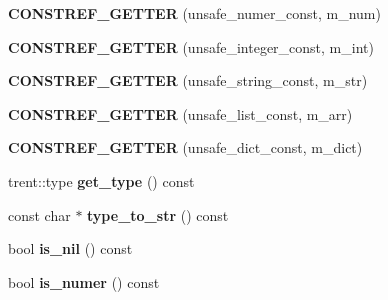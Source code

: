 \begin{DoxyCompactItemize}
\item 
{\bfseries C\+O\+N\+S\+T\+R\+E\+F\+\_\+\+G\+E\+T\+T\+ER} (unsafe\+\_\+numer\+\_\+const, m\+\_\+num)\hypertarget{classgxx_1_1trent_a3c13b54a5b5c8a412837bca0127f3394}{}\label{classgxx_1_1trent_a3c13b54a5b5c8a412837bca0127f3394}

\item 
{\bfseries C\+O\+N\+S\+T\+R\+E\+F\+\_\+\+G\+E\+T\+T\+ER} (unsafe\+\_\+integer\+\_\+const, m\+\_\+int)\hypertarget{classgxx_1_1trent_a32ca1404de878b5351b41cb5bf27bf04}{}\label{classgxx_1_1trent_a32ca1404de878b5351b41cb5bf27bf04}

\item 
{\bfseries C\+O\+N\+S\+T\+R\+E\+F\+\_\+\+G\+E\+T\+T\+ER} (unsafe\+\_\+string\+\_\+const, m\+\_\+str)\hypertarget{classgxx_1_1trent_a14e00a0156824e8ed9f276d70ef95ee1}{}\label{classgxx_1_1trent_a14e00a0156824e8ed9f276d70ef95ee1}

\item 
{\bfseries C\+O\+N\+S\+T\+R\+E\+F\+\_\+\+G\+E\+T\+T\+ER} (unsafe\+\_\+list\+\_\+const, m\+\_\+arr)\hypertarget{classgxx_1_1trent_a0807cad038ec14b2c9ab5be07eaa1ebb}{}\label{classgxx_1_1trent_a0807cad038ec14b2c9ab5be07eaa1ebb}

\item 
{\bfseries C\+O\+N\+S\+T\+R\+E\+F\+\_\+\+G\+E\+T\+T\+ER} (unsafe\+\_\+dict\+\_\+const, m\+\_\+dict)\hypertarget{classgxx_1_1trent_a96a6dc69d63e7cb2100c51632b0c0537}{}\label{classgxx_1_1trent_a96a6dc69d63e7cb2100c51632b0c0537}

\item 
trent\+::type {\bfseries get\+\_\+type} () const \hypertarget{classgxx_1_1trent_a627ead1224be6702e7a1aa3f87e9e91b}{}\label{classgxx_1_1trent_a627ead1224be6702e7a1aa3f87e9e91b}

\item 
const char $\ast$ {\bfseries type\+\_\+to\+\_\+str} () const \hypertarget{classgxx_1_1trent_a490ca7feb48b02aaccba3a65f8098ae1}{}\label{classgxx_1_1trent_a490ca7feb48b02aaccba3a65f8098ae1}

\item 
bool {\bfseries is\+\_\+nil} () const \hypertarget{classgxx_1_1trent_a8f280de78dd5998346a053fa8f6445a4}{}\label{classgxx_1_1trent_a8f280de78dd5998346a053fa8f6445a4}

\item 
bool {\bfseries is\+\_\+numer} () const \hypertarget{classgxx_1_1trent_a167f8afd6010d9a05bd5ee87a9ec6b5e}{}\label{classgxx_1_1trent_a167f8afd6010d9a05bd5ee87a9ec6b5e}


\end{DoxyCompactItemize}
